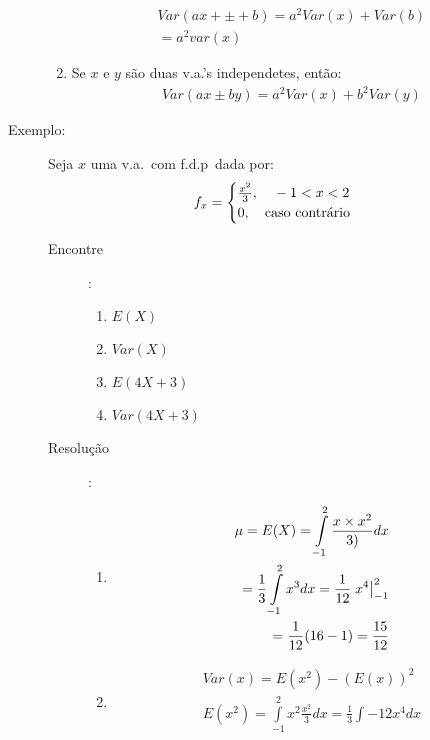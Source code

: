 \begin{description}
\begin{enumerate}[label=(\alph*)]
              \begin{align*}
               Var(ax+\pm+b)=a^2 Var(x)+Var(b)\\
             =a^2 var(x)
             \end{align*}
           \item Se $x$ e $y$ são duas v.a.'s independetes, então: 
\begin{align*}
               Var(ax \pm by)=a^2 Var(x)+ b^2 Var(y)
\end{align*}
         \end{enumerate}
       \item [Exemplo:] Seja $x$ uma v.a.\ com f.d.p\ dada por: 
         \begin{align}
           f_{x}=
           \begin{cases}
             \frac{x^2}{3}, \text{\quad} -1<x<2\\
             0, \text{\quad caso contrário}
           \end{cases}
         \end{align}
         \begin{description}
           \item [Encontre]:
         \begin{enumerate}[label=(\alph*)]
           \item $E(X)$
           \item $Var(X)$
           \item $E(4X+3)$
           \item $Var(4X+3)$
         \end{enumerate}
       \item [Resolução]:
         \begin{enumerate}[label=(\alph*)]
           \item 
             \begin{align*}
               \mu= E(X)=  \int \limits_{-1}^{2}\frac{x\times x^2}{3)}dx\\
               =\frac{1}{3}\int \limits_{-1}^{2}x^3dx=\frac{1}{12} \left.x^4\right\rvert_{-1}^{2}\\
               =\frac{1}{12}(16-1)=\frac{15}{12}
             \end{align*}
           \item 
             \begin{align*}
               Var(x)=E(x^2)-\left(E(x)\right)^2\\
               E(x^2)=\int \limits_{-1}^{2} x^2 \frac{x^2}{3}dx
               =\frac{1}{3}\int{-1}{2} x^4 dx\\

\end{align*}
\end{enumerate}
\end{description}
\end{description}
